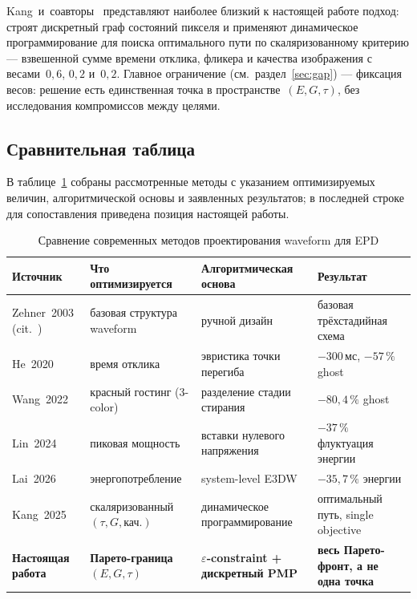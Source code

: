 Kang~и~соавторы~\cite{kang2025_dp_waveform} представляют наиболее близкий к
настоящей работе подход: строят дискретный граф состояний пикселя и применяют
динамическое программирование для поиска оптимального пути по скаляризованному
критерию --- взвешенной сумме времени отклика, фликера и качества изображения
с весами~$0{,}6$, $0{,}2$ и~$0{,}2$. Главное ограничение (см.~раздел~\ref{sec:gap}) --- фиксация весов: решение есть единственная точка в
пространстве~$(E, G, \tau)$, без исследования компромиссов между целями.

\subsection*{Сравнительная таблица}

В таблице~\ref{tab:waveform-methods} собраны рассмотренные методы с указанием
оптимизируемых величин, алгоритмической основы и заявленных результатов;
в последней строке для сопоставления приведена позиция настоящей работы.

\begin{table}[H]
    \caption{Сравнение современных методов проектирования waveform для EPD}\label{tab:waveform-methods}
    \begin{tabular}{l p{3.5cm} p{3.5cm} p{3.5cm}}
        \toprule
        Источник & Что оптимизируется & Алгоритмическая основа & Результат \\
        \midrule
        Zehner~2003 (cit.\ \cite{kang2025_dp_waveform}) & базовая структура waveform & ручной дизайн & базовая трёхстадийная схема \\
        He~2020~\cite{he2020_particle_activation} & время отклика & эвристика точки перегиба & $-300$\,мс, $-57\,\%$ ghost \\
        Wang~2022~\cite{wang2022_red_ghost} & красный гостинг (3-color) & разделение стадии стирания & $-80{,}4\,\%$ ghost \\
        Lin~2024~\cite{lin2024_low_power} & пиковая мощность & вставки нулевого напряжения & $-37\,\%$ флуктуация энергии \\
        Lai~2026~\cite{lai2026_e3dw_energy} & энерго\-потребление & system-level E3DW & $-35{,}7\,\%$ энергии \\
        Kang~2025~\cite{kang2025_dp_waveform} & скаляризованный $(\tau, G, \text{кач.})$ & динамическое программирование & оптимальный путь, single objective \\
        \textbf{Настоящая работа} & \textbf{Парето-граница $(E, G, \tau)$} & \textbf{$\varepsilon$-constraint + дискретный PMP} & \textbf{весь Парето-фронт, а не одна точка} \\
        \bottomrule
    \end{tabular}
\end{table}


